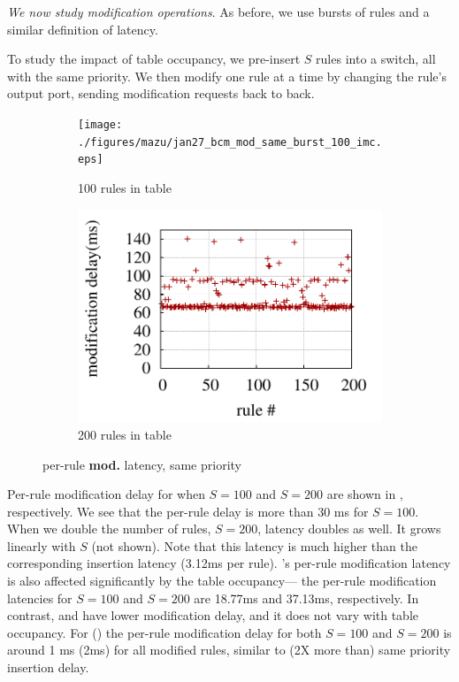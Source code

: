 
{\emph {We now study modification operations}}. As before, we use bursts of rules and
a similar definition of latency.

 To study the impact of table
occupancy, we pre-insert $S$ rules into a switch,
all with the same priority. We then modify one rule at a time by changing the
rule's output port, sending modification requests back to back. 

\begin{figure}[!tb]
	\centering
        \begin{subfigure}[b]{0.40\textwidth}
                \centering
		\texttt{[image: ./figures/mazu/jan27\_bcm\_mod\_same\_burst\_100\_imc.eps]}
		\caption{100 rules in table}
		\label{fig:bcm_mod_same_burst_100}
	\end{subfigure}
        \begin{subfigure}[b]{0.40\textwidth}
                \centering
		\includegraphics[width=\textwidth]{./figures/mazu/jan27_bcm_mod_same_burst_200-eps-converted-to.pdf}
		\caption{200 rules in table}
		\label{fig:bcm_mod_same_burst_200}
	\end{subfigure}
	\caption{{\bf \BroadcomOne} per-rule {\bf mod.} latency, same priority}
	\label{fig:occupancy-broadcom-modify}
\end{figure}
 
Per-rule modification delay for \BroadcomOne when $S=100$ and $S=200$ are shown in
, respectively. We
see that the per-rule delay
is more than 30 ms for $S=100$. When we double the number of rules,
$S=200$, latency doubles as well. It grows
linearly with $S$ (not shown). Note that
this latency is much higher than the corresponding
insertion latency (3.12ms per rule).
\IBM's per-rule modification latency is also affected significantly by the table occupancy---
the per-rule modification latencies for $S=100$ and $S=200$ are 18.77ms and 37.13ms, respectively.
In contrast, \Intel and \BroadcomThree  have lower modification delay,
and it does not vary with table occupancy. For \Intel (\BroadcomThree) the
per-rule modification delay for both $S=100$ and $S=200$ is around 1 ms (2ms)
for all modified rules, similar to (2X more than) same priority insertion delay. 


